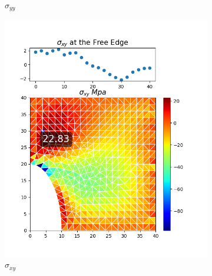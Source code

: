 \documentclass[twoside,twocolumn,10pt]{article}
\begin{document}
\begin{figure}[!ht]
\begin{subfigure}[c]{0.26\textwidth}
    \caption{$\sigma_{yy}$}
    \label{fig:y_triangle_0.5}
  \end{subfigure}%
  \hfill
  \begin{subfigure}[c]{0.26\textwidth}
    \includegraphics[width=1.\linewidth]{Q2_5/Q5_0.5_xy_triangle.png}
    \caption{$\sigma_{xy}$}
    \label{fig:xy_triangle_0.5}
  \end{subfigure}%
  \begin{subfigure}[c]{0.26\textwidth}

\end{subfigure}
\end{figure}
\end{document}
